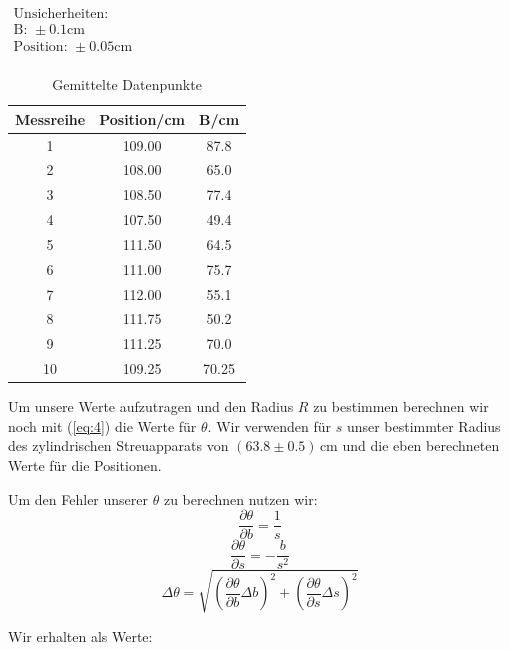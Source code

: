 \documentclass[11pt,a4paper]{article}
\begin{document}
\begin{table}[h]
\centering
\caption{Gemittelte Datenpunkte} \vspace{11pt}
$\begin{array}{l}
\textrm{Unsicherheiten:}\\
\textrm{B: } \pm 0.1 \textrm{cm}\\
\textrm{Position: } \pm 0.05 \textrm{cm}\\
\end{array}$
\begin{tabular}{ccc}
\toprule
\textrm{Messreihe} & \textrm{Position}/\textrm{cm} & \textrm{B}/\textrm{cm} \\
\midrule 
1 & 109.00 & 87.8 \\
2 & 108.00 & 65.0 \\
3 & 108.50 & 77.4 \\
4 & 107.50 & 49.4\\
5 & 111.50 & 64.5 \\
6 & 111.00 & 75.7\\
7 & 112.00 & 55.1 \\
8 & 111.75 & 50.2 \\
9 & 111.25 & 70.0 \\
10 & 109.25 & 70.25 \\ 
\bottomrule
\end{tabular}
\label{Tab:1}
\end{table}

Um unsere Werte aufzutragen und den Radius $R$ zu bestimmen berechnen wir noch mit (\ref{eq:4}) die Werte f\"ur $\theta$. Wir verwenden f\"ur $s$ unser bestimmter Radius des zylindrischen Streuapparats von $(63.8\pm0.5)$\,cm und die eben berechneten Werte f\"ur die Positionen.

Um den Fehler unserer $\theta$ zu berechnen nutzen wir:
\[
\frac{\partial\theta}{\partial b}=\frac{1}{s}
\]
\[
\frac{\partial\theta}{\partial s}=-\frac{b}{s^2}
\]
\[
\Delta\theta=\sqrt{\left(\frac{\partial\theta}{\partial b}\Delta b\right)^2+\left(\frac{\partial\theta}{\partial s}\Delta s\right)^2}
\]

Wir erhalten als Werte:
\end{document}
